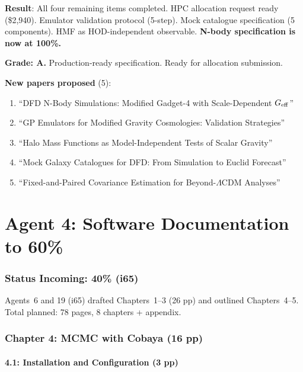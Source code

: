 \documentclass[11pt,a4paper]{article}
\begin{document}
\begin{tcolorbox}[colback=green!5!white, colframe=green!60!black, title={Agent 3: N-Body Specification at 100\%}]
\textbf{Result}: All four remaining items completed. HPC allocation request ready (\$2,940). Emulator validation protocol (5-step). Mock catalogue specification (5 components). HMF as HOD-independent observable. \textbf{N-body specification is now at 100\%.}

\textbf{Grade: A.} Production-ready specification. Ready for allocation submission.

\textbf{New papers proposed} (5):
\begin{enumerate}
\item ``DFD N-Body Simulations: Modified Gadget-4 with Scale-Dependent $G_{\rm eff}$''
\item ``GP Emulators for Modified Gravity Cosmologies: Validation Strategies''
\item ``Halo Mass Functions as Model-Independent Tests of Scalar Gravity''
\item ``Mock Galaxy Catalogues for DFD: From Simulation to Euclid Forecast''
\item ``Fixed-and-Paired Covariance Estimation for Beyond-$\Lambda$CDM Analyses''
\end{enumerate}
\end{tcolorbox}


\part{Agent 4: Software Documentation to 60\%}
\label{part:software-docs}

\section{Status Incoming: 40\% (i65)}

Agents~6 and 19 (i65) drafted Chapters~1--3 (26 pp) and outlined Chapters~4--5. Total planned: 78 pages, 8 chapters + appendix.

\section{Chapter 4: MCMC with Cobaya (16 pp)}

\subsection{4.1: Installation and Configuration (3 pp)}
\end{document}
